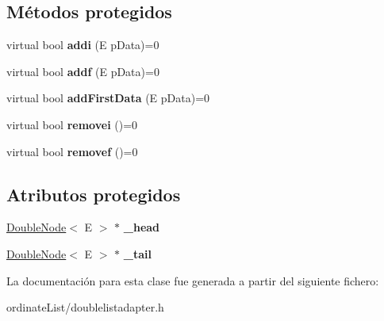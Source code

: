 \subsection*{Métodos protegidos}
\begin{DoxyCompactItemize}
\item 
\hypertarget{classDoubleListAdapter_a74a41e06683241f5a7d9b9d0ed38eaf9}{virtual bool {\bfseries addi} (E p\-Data)=0}\label{classDoubleListAdapter_a74a41e06683241f5a7d9b9d0ed38eaf9}

\item 
\hypertarget{classDoubleListAdapter_adf4e6a8a4479d1fa0e692aea0d254c0f}{virtual bool {\bfseries addf} (E p\-Data)=0}\label{classDoubleListAdapter_adf4e6a8a4479d1fa0e692aea0d254c0f}

\item 
\hypertarget{classDoubleListAdapter_a024ff60d5cb3e11ff5be795f48deaac0}{virtual bool {\bfseries add\-First\-Data} (E p\-Data)=0}\label{classDoubleListAdapter_a024ff60d5cb3e11ff5be795f48deaac0}

\item 
\hypertarget{classDoubleListAdapter_a710e75ff353e5e94ae1fb9eadc0b582b}{virtual bool {\bfseries removei} ()=0}\label{classDoubleListAdapter_a710e75ff353e5e94ae1fb9eadc0b582b}

\item 
\hypertarget{classDoubleListAdapter_a1f069987bb3e8abcccf24659474960c3}{virtual bool {\bfseries removef} ()=0}\label{classDoubleListAdapter_a1f069987bb3e8abcccf24659474960c3}

\end{DoxyCompactItemize}
\subsection*{Atributos protegidos}
\begin{DoxyCompactItemize}
\item 
\hypertarget{classDoubleListAdapter_a1c01340613e7545d5ab74286686053fa}{\hyperlink{classDoubleNode}{Double\-Node}$<$ E $>$ $\ast$ {\bfseries \-\_\-head}}\label{classDoubleListAdapter_a1c01340613e7545d5ab74286686053fa}

\item 
\hypertarget{classDoubleListAdapter_a68c6a578e4668b8c28895ac271c4c2b9}{\hyperlink{classDoubleNode}{Double\-Node}$<$ E $>$ $\ast$ {\bfseries \-\_\-tail}}\label{classDoubleListAdapter_a68c6a578e4668b8c28895ac271c4c2b9}

\end{DoxyCompactItemize}


La documentación para esta clase fue generada a partir del siguiente fichero\-:\begin{DoxyCompactItemize}
\item 
ordinate\-List/doublelistadapter.\-h\end{DoxyCompactItemize}
